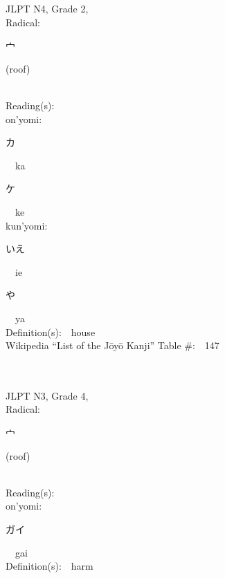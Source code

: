 \begin{multicols}{2}
{JLPT N4, Grade 2, \\Radical:\ \ {\begin{CJK}{UTF8}{min} 宀 \end{CJK}} (roof) } \\
Reading(s):\ \ \\
{\hspace*{1em}}on'yomi:\ \ \\
{\hspace*{2em}}{\begin{CJK}{UTF8}{min} カ \end{CJK}}\ \ ka\ \ \\
{\hspace*{2em}}{\begin{CJK}{UTF8}{min} ケ \end{CJK}}\ \ ke\ \ \\
{\hspace*{1em}}kun'yomi:\ \ \\
{\hspace*{2em}}{\begin{CJK}{UTF8}{min} いえ \end{CJK}}\ \ ie\ \ \\
{\hspace*{2em}}{\begin{CJK}{UTF8}{min} や \end{CJK}}\ \ ya\ \ \\
Definition(s):\ \ house \\
Wikipedia ``List of the J\=oy\=o Kanji'' Table \#:\ \ 147 \\
\ \ \\
{\fontsize{34pt}{40pt}  }\ \ \\  %
{JLPT N3, Grade 4, \\Radical:\ \ {\begin{CJK}{UTF8}{min} 宀 \end{CJK}} (roof) } \\
Reading(s):\ \ \\
{\hspace*{1em}}on'yomi:\ \ \\
{\hspace*{2em}}{\begin{CJK}{UTF8}{min} ガイ \end{CJK}}\ \ gai\ \ \\
Definition(s):\ \ harm \\

\end{multicols}
